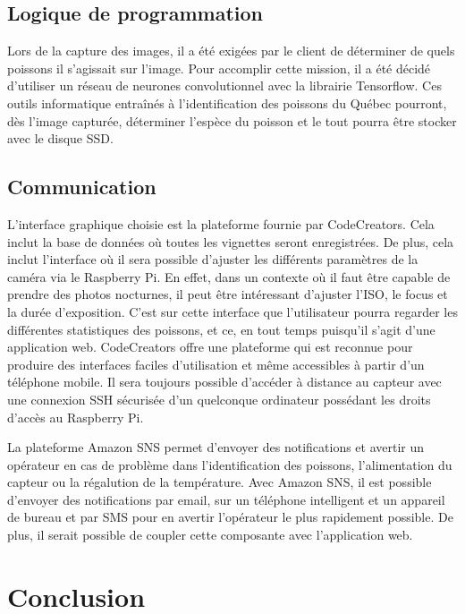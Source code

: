 \subsection{Logique de programmation}

Lors de la capture des images, il a été exigées par le client de déterminer de quels poissons il s'agissait sur l'image. Pour accomplir cette mission, il a été décidé d'utiliser un réseau de neurones convolutionnel avec la librairie Tensorflow. Ces outils informatique entraînés à l'identification des poissons du Québec pourront, dès l'image capturée, déterminer l'espèce du poisson et le tout pourra être stocker avec le disque SSD.
\vspace{5mm}

\subsection{Communication}

L'interface graphique choisie est la plateforme fournie par CodeCreators. Cela inclut la base de données où toutes les vignettes seront enregistrées. De plus, cela inclut l'interface où il sera possible d'ajuster les différents paramètres de la caméra via le Raspberry Pi. En effet, dans un contexte où il faut être capable de prendre des photos nocturnes, il peut être intéressant d'ajuster l'ISO, le focus et la durée d'exposition. C'est sur cette interface que l'utilisateur pourra regarder les différentes statistiques des poissons, et ce, en tout temps puisqu'il s'agit d'une application web. CodeCreators offre une plateforme qui est reconnue pour produire des interfaces faciles d'utilisation et même accessibles à partir d'un téléphone mobile. Il sera toujours possible d'accéder à distance au capteur avec une connexion SSH sécurisée d'un quelconque ordinateur possédant les droits d'accès au Raspberry Pi.
\vspace{5mm}

La plateforme Amazon SNS permet d'envoyer des notifications et avertir un opérateur en cas de problème dans l'identification des poissons, l'alimentation du capteur ou la régalution de la température. Avec Amazon SNS, il est possible d'envoyer des notifications par email, sur un téléphone intelligent et un appareil de bureau et par SMS pour en avertir l'opérateur le plus rapidement possible. De plus, il serait possible de coupler cette composante avec l'application web.


\section{Conclusion}

